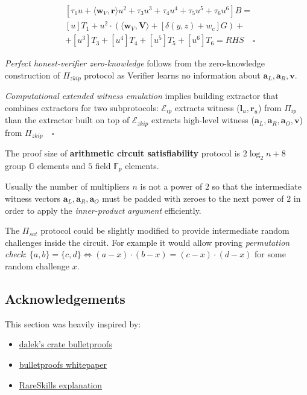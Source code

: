 \documentclass[../lecture-notes-148x210.tex]{subfiles}
\begin{document}
\begin{itemize}
\begin{equation*}
\begin{aligned}
            & [\tau_1 u + \langle \mathbf{w}_V, \mathbf{r} \rangle u^2 + \tau_3 u^3 + \tau_4 u^4 + \tau_5 u^5 + \tau_6 u^6]B = \\
            & [u]T_1 + u^2 \cdot (\langle \mathbf{w}_V, \mathbf{V} \rangle + [\delta(y,z) + w_c]G) +\\
            &+ [u^3]T_3 + [u^4]T_4 + [u^5]T_5 + [u^6]T_6 = RHS \quad \square
        \end{aligned}
    \end{equation*}
\end{itemize}

\textit{Perfect honest-verifier zero-knowledge} follows from the zero-knowledge construction of $\Pi_{zkip}$ protocol as Verifier learns no information about $\mathbf{a}_L, \mathbf{a}_R, \mathbf{v}$.

\textit{Computational extended witness emulation} implies building extractor that combines extractors for two subprotocols: $\mathcal{E}_{ip}$ extracts witness ($\mathbf{l}_u, \mathbf{r}_u$) from $\Pi_{ip}$ than the extractor built on top of $\mathcal{E}_{zkip}$ extracts high-level witness ($\mathbf{a}_L, \mathbf{a}_R, \mathbf{a}_O, \mathbf{v}$) from $\Pi_{zkip} \quad \square$

The proof size of \textbf{arithmetic circuit satisfiability} protocol is $2 \log_2n +8$ group $\mathbb{G}$ elements and $5$ field $\mathbb{F}_p$ elements.

Usually the number of multipliers $n$ is not a power of $2$ so that the intermediate witness vectors $\mathbf{a}_L, \mathbf{a}_R, \mathbf{a}_O$ must be padded with zeroes to the next power of $2$ in order to apply the \textit{inner-product argument} efficiently. 
\begin{remark}
    The $\Pi_{sat}$ protocol could be slightly modified to provide intermediate random challenges inside the circuit. For example it would allow proving \textit{permutation check}: $\{a,b\} = \{c,d\}  \iff (a-x)\cdot(b-x) = (c-x)\cdot(d-x)$ for some random challenge $x$.
\end{remark}
\subsection*{Acknowledgements}
This section was heavily inspired by:
\begin{itemize}
    \item \href{https://doc-internal.dalek.rs/bulletproofs/index.html}{dalek's crate bulletproofs}
    \item \href{https://eprint.iacr.org/2017/1066.pdf}{bulletproofs whitepaper}
    \item \href{https://rareskills.io/post/zk-multiplication}{RareSkills explanation}
\end{itemize}
\end{document}
